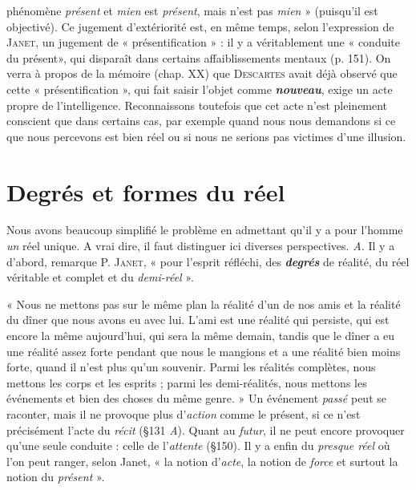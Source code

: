 phénomène {\it présent} et {\it mien} est {\it présent}, mais n’est pas {\it mien} » (puisqu’il
est objectivé). Ce jugement d’extériorité est, en même temps,
selon l’expression de \textsc{Janet}, un jugement de « présentification » : il
y a véritablement une « conduite du présent», qui disparaît dans certains
affaiblissements mentaux (p. 151). On verra à propos de la
mémoire (chap. XX) que \textsc{Descartes} avait déjà observé que cette « présentification »,
qui fait saisir l’objet comme \textbf{\textit {nouveau}}, exige un acte
propre de l'intelligence. Reconnaissons toutefois que cet acte n’est
pleinement conscient que dans certains cas, par exemple quand nous
nous demandons si ce que nous percevons est bien réel ou si nous
ne serions pas victimes d’une illusion.

\section{Degrés et formes du réel}%
Nous avons beaucoup simplifié
le problème en admettant qu’il y a pour l’homme {\it un} réel unique.
A vrai dire, il faut distinguer ici diverses perspectives. {\it A.} Il y a
d’abord, remarque P. \textsc{Janet}, « pour l’esprit réfléchi, des \textbf{\textit {degrés}} de réalité,
du réel véritable et complet et du {\it demi-réel} ».

\vspace{0.24cm}
{\footnotesize 
« Nous ne mettons pas sur le même plan la réalité d’un de nos amis et la
réalité du dîner que nous avons eu avec lui. L’ami est une réalité qui persiste,
qui est encore la même aujourd’hui, qui sera la même demain, tandis
que le dîner a eu une réalité assez forte pendant que nous le mangions et a
une réalité bien moins forte, quand il n’est plus qu’un souvenir. Parmi les
réalités complètes, nous mettons les corps et les esprits ; parmi les demi-réalités,
nous mettons les événements et bien des choses du même genre. »
Un événement {\it passé} peut se raconter, mais il ne provoque plus d’\textsf{\textit {action}}
comme le présent, si ce n’est précisément l’acte du {\it récit} (\S 131 {\it A}). Quant au
{\it futur}, il ne peut encore provoquer qu’une seule conduite : celle de l'{\it attente}
(\S 150). Il y a enfin du \textsf{\textit {presque réel}} où l’on peut ranger, selon Janet, « la
notion d’{\it acte}, la notion de {\it force} et surtout la notion du {\it présent} ».}
\vspace{0.31cm}

